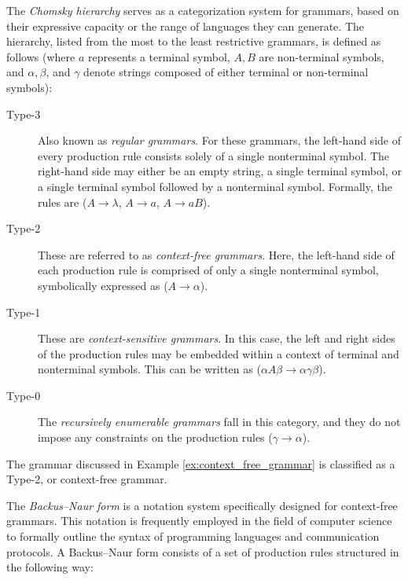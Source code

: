 The \emph{Chomsky hierarchy} serves as a categorization system for grammars, based on their expressive capacity or the range of languages they can generate. The hierarchy, listed from the most to the least restrictive grammars, is defined as follows (where $a$ represents a terminal symbol, $A, B$ are non-terminal symbols, and $\alpha, \beta$, and $\gamma$ denote strings composed of either terminal or non-terminal symbols):

\begin{description}
\item[Type-3] Also known as \emph{regular grammars}. For these grammars, the left-hand side of every production rule consists solely of a single nonterminal symbol. The right-hand side may either be an empty string, a single terminal symbol, or a single terminal symbol followed by a nonterminal symbol. Formally, the rules are ($A \rightarrow \lambda$, $A \rightarrow a$, $A \rightarrow aB$).

\item[Type-2] These are referred to as \emph{context-free grammars}. Here, the left-hand side of each production rule is comprised of only a single nonterminal symbol, symbolically expressed as ($A \rightarrow \alpha$).

\item[Type-1] These are \emph{context-sensitive grammars}. In this case, the left and right sides of the production rules may be embedded within a context of terminal and nonterminal symbols. This can be written as ($\alpha A \beta \rightarrow \alpha \gamma \beta$).

\item[Type-0] The \emph{recursively enumerable grammars} fall in this category, and they do not impose any constraints on the production rules ($\gamma \rightarrow \alpha$).
\end{description}

\begin{example}
The grammar discussed in Example \ref{ex:context_free_grammar} is classified as a Type-2, or context-free grammar.
\end{example}

The \emph{Backus–Naur form} is a notation system specifically designed for context-free grammars. This notation is frequently employed in the field of computer science to formally outline the syntax of programming languages and communication protocols. A Backus–Naur form consists of a set of production rules structured in the following way:

